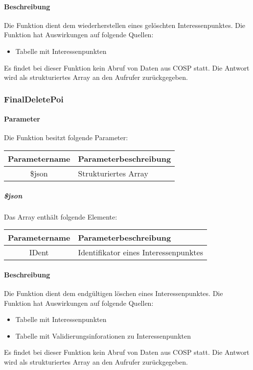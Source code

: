 \paragraph{Beschreibung} Die Funktion dient dem wiederherstellen eines gelöschten Interessenpunktes. Die Funktion hat Auswirkungen auf folgende Quellen:
\begin{itemize}
	\item Tabelle mit Interessenpunkten
\end{itemize}
Es findet bei dieser Funktion kein Abruf von Daten aus {\glqq COSP\grqq} statt. Die Antwort wird als strukturiertes Array an den Aufrufer zurückgegeben.
\subsubsection{FinalDeletePoi}
\paragraph{Parameter} Die Funktion besitzt folgende Parameter:
\begin{table}[H]
	\begin{tabular}{|c|p{11cm}|}
		\hline
		\textbf{Parametername} & \textbf{Parameterbeschreibung} \\ \hline
		\$json & Strukturiertes Array \\ \hline
	\end{tabular}
\end{table}
\subparagraph{\$json}Das Array enthält folgende Elemente:
\begin{table}[H]
	\begin{tabular}{|c|p{11cm}|}
		\hline
		\textbf{Parametername} & \textbf{Parameterbeschreibung} \\ \hline
		IDent & Identifikator eines Interessenpunktes \\ \hline
	\end{tabular}
\end{table}
\paragraph{Beschreibung} Die Funktion dient dem endgültigen löschen eines Interessenpunktes. Die Funktion hat Auswirkungen auf folgende Quellen:
\begin{itemize}
	\item Tabelle mit Interessenpunkten
	\item Tabelle mit Validierungsinforationen zu Interessenpunkten
\end{itemize}
Es findet bei dieser Funktion kein Abruf von Daten aus {\glqq COSP\grqq} statt. Die Antwort wird als strukturiertes Array an den Aufrufer zurückgegeben.
